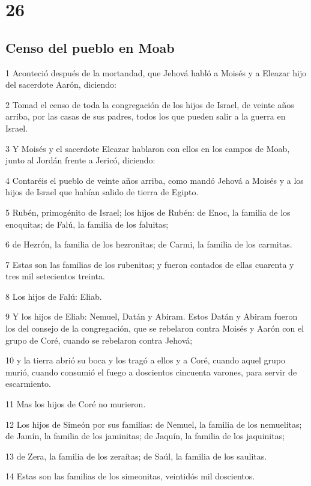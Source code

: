 \chapter{26}

\section*{Censo del pueblo en Moab}

\par 1 Aconteció después de la mortandad, que Jehová habló a Moisés y a Eleazar hijo del sacerdote Aarón, diciendo:
\par 2 Tomad el censo de toda la congregación de los hijos de Israel, de veinte años arriba, por las casas de sus padres, todos los que pueden salir a la guerra en Israel.
\par 3 Y Moisés y el sacerdote Eleazar hablaron con ellos en los campos de Moab, junto al Jordán frente a Jericó, diciendo:
\par 4 Contaréis el pueblo de veinte años arriba, como mandó Jehová a Moisés y a los hijos de Israel que habían salido de tierra de Egipto.
\par 5 Rubén, primogénito de Israel; los hijos de Rubén: de Enoc, la familia de los enoquitas; de Falú, la familia de los faluitas;
\par 6 de Hezrón, la familia de los hezronitas; de Carmi, la familia de los carmitas.
\par 7 Estas son las familias de los rubenitas; y fueron contados de ellas cuarenta y tres mil setecientos treinta.
\par 8 Los hijos de Falú: Eliab.
\par 9 Y los hijos de Eliab: Nemuel, Datán y Abiram. Estos Datán y Abiram fueron los del consejo de la congregación, que se rebelaron contra Moisés y Aarón con el grupo de Coré, cuando se rebelaron contra Jehová;
\par 10 y la tierra abrió su boca y los tragó a ellos y a Coré, cuando aquel grupo murió, cuando consumió el fuego a doscientos cincuenta varones, para servir de escarmiento.
\par 11 Mas los hijos de Coré no murieron.
\par 12 Los hijos de Simeón por sus familias: de Nemuel, la familia de los nemuelitas; de Jamín, la familia de los jaminitas; de Jaquín, la familia de los jaquinitas;
\par 13 de Zera, la familia de los zeraítas; de Saúl, la familia de los saulitas.
\par 14 Estas son las familias de los simeonitas, veintidós mil doscientos.
